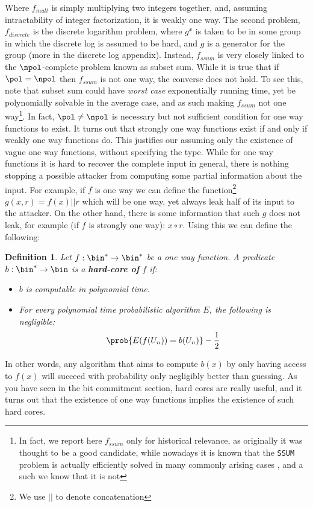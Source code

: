 \documentclass{article}
\newtheorem{definition}{Definition}
\begin{document}
Where $f_{mult}$ is simply multiplying two integers together, and, assuming intractability of integer factorization, it is weakly one way.
The second problem, $f_{discrete}$ is the discrete logarithm problem, where $g^x$ is taken to be in some group in which the discrete log is assumed
to be hard, and $g$ is a generator for the group (more in the discrete log appendix).
Instead, $f_{ssum}$ is very closely linked to the $\npol$-complete problem known as subset sum.
While it is true that if $\pol = \npol$ then $f_{ssum}$ is not one way, the converse does not hold. To see this, note that subset sum could have \textit{worst case} exponentially running time, yet be polynomially solvable in the average case, and as such making $f_{ssum}$ not one way\footnote{In fact, we
    report here $f_{ssum}$ only for historical relevance, as originally it was thought to be a good candidate, while nowadays
    it is known that the \texttt{SSUM} problem is actually efficiently solved in many commonly arising cases \cite{lagariasSolvingLowdensitySubset1985}, and a such we know that it is not}.
In fact, $\pol \neq \npol$ is necessary but not sufficient condition for one way functions to exist.
It turns out \cite{goldreichFoundationsCryptographyVol2007} that strongly one way functions exist if and only if weakly one way functions do. This justifies our assuming only the existence of vague one way functions, without specifying the type.
While for one way functions it is hard to recover the complete input in general, there is nothing stopping a possible attacker from computing some partial information about the input.
For example, if $f$ is one way we can define the function\footnote{We use $||$ to denote concatenation} $g(x, r) = f(x) || r$ which will be one way, yet always leak half of its input to the attacker.
On the other hand, there is some information that such $g$ does not leak, for example (if $f$ is strongly one way): $x \circ r$.
Using this we can define the following:
\begin{definition}
    Let $f: \bin^* \to \bin^*$ be a one way function. A predicate $b: \bin^* \to \bin$ is
    a \textbf{hard-core of} $f$ if:
    \begin{itemize}
        \item $b$ is computable in polynomial time.
        \item For every polynomial time probabilistic algorithm $E$, the following is negligible:
              \[ \prob{E(f(U_n)) = b(U_n)} - \frac{1}{2} \]
    \end{itemize}
\end{definition}
In other words, any algorithm that aims to compute $b(x)$ by only having access to $f(x)$ will succeed with probability
only negligibly better than guessing. As you have seen in the bit commitment section, hard cores are really useful, and it turns out \cite{goldreichFoundationsCryptographyVol2007} that the existence of one way functions implies the existence of such hard cores.
\end{document}
